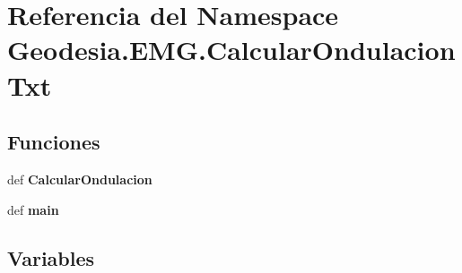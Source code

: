 \section{Referencia del Namespace Geodesia.\-E\-M\-G.\-Calcular\-Ondulacion\-Txt}
\label{namespaceGeodesia_1_1EMG_1_1CalcularOndulacionTxt}
\subsection*{Funciones}
\begin{DoxyCompactItemize}
\item 
def {\bf Calcular\-Ondulacion}
\item 
def {\bf main}
\end{DoxyCompactItemize}
\subsection*{Variables}
